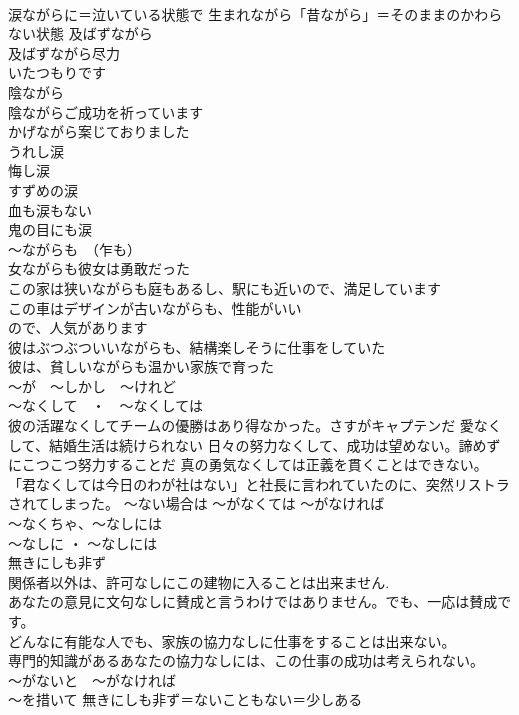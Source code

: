 \documentclass[8pt]{extreport}
\begin{document}
\begin{CJK}{UTF8}{min}
\\	涙ながらに＝泣いている状態で 生まれながら「昔ながら」＝そのままのかわらない状態	及ばずながら 
\\	及ばずながら尽力
\\	いたつもりです 
\\	陰ながら 
\\	陰ながらご成功を祈っています 
\\	かげながら案じておりました 
\\	うれし涙 
\\	悔し涙 
\\	すずめの涙 
\\	血も涙もない 
\\	鬼の目にも涙 
\\	～ながらも　（乍も）	
\\	女ながらも彼女は勇敢だった 
\\	この家は狭いながらも庭もあるし、駅にも近いので、満足しています 
\\	この車はデザインが古いながらも、性能がいい
\\	ので、人気があります 
\\	彼はぶつぶついいながらも、結構楽しそうに仕事をしていた 
\\	彼は、貧しいながらも温かい家族で育った 
\\	～が　～しかし　～けれど	
\\	～なくして　・　～なくしては 
\\	彼の活躍なくしてチームの優勝はあり得なかった。さすがキャプテンだ 愛なくして、結婚生活は続けられない 日々の努力なくして、成功は望めない。諦めずにこつこつ努力することだ 真の勇気なくしては正義を貫くことはできない。 「君なくしては今日のわが社はない」と社長に言われていたのに、突然リストラされてしまった。	～ない場合は ～がなくては ～がなければ 
\\	～なくちゃ、～なしには
\\	～なしに ・ ～なしには 
\\	無きにしも非ず	
\\	関係者以外は、許可なしにこの建物に入ることは出来ません. 
\\	あなたの意見に文句なしに賛成と言うわけではありません。でも、一応は賛成です。 
\\	どんなに有能な人でも、家族の協力なしに仕事をすることは出来ない。 
\\	専門的知識があるあなたの協力なしには、この仕事の成功は考えられない。 
\\	～がないと　～がなければ 
\\	～を措いて 無きにしも非ず＝ないこともない＝少しある 

\end{CJK}
\end{document}
